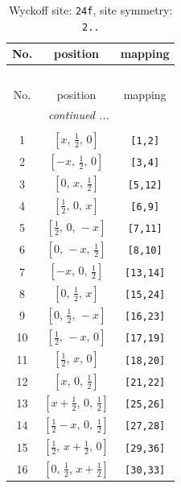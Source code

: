 \documentclass[fleqn,8pt]{jsarticle}
\begin{document}
\begin{longtable}{ccc}
\caption{Wyckoff site: {\tt 24f}, site symmetry: {\tt 2..}}
 \\
 \hline \hline
No. & position & mapping \\ \hline \endfirsthead

\multicolumn{2}{l}{\tablename\ \thetable{}} \\
 \hline \hline
No. & position & mapping \\ \hline \endhead

 \hline \hline
\multicolumn{2}{r}{\footnotesize\it continued ...} \\ \endfoot

 \hline \hline
\multicolumn{2}{r}{} \\ \endlastfoot

1 & $\left[ x,\, \frac{1}{2},\, 0 \right]$ & {\tt [1,2]} \\ \hline
2 & $\left[ - x,\, \frac{1}{2},\, 0 \right]$ & {\tt [3,4]} \\ \hline
3 & $\left[ 0,\, x,\, \frac{1}{2} \right]$ & {\tt [5,12]} \\ \hline
4 & $\left[ \frac{1}{2},\, 0,\, x \right]$ & {\tt [6,9]} \\ \hline
5 & $\left[ \frac{1}{2},\, 0,\, - x \right]$ & {\tt [7,11]} \\ \hline
6 & $\left[ 0,\, - x,\, \frac{1}{2} \right]$ & {\tt [8,10]} \\ \hline
7 & $\left[ - x,\, 0,\, \frac{1}{2} \right]$ & {\tt [13,14]} \\ \hline
8 & $\left[ 0,\, \frac{1}{2},\, x \right]$ & {\tt [15,24]} \\ \hline
9 & $\left[ 0,\, \frac{1}{2},\, - x \right]$ & {\tt [16,23]} \\ \hline
10 & $\left[ \frac{1}{2},\, - x,\, 0 \right]$ & {\tt [17,19]} \\ \hline
11 & $\left[ \frac{1}{2},\, x,\, 0 \right]$ & {\tt [18,20]} \\ \hline
12 & $\left[ x,\, 0,\, \frac{1}{2} \right]$ & {\tt [21,22]} \\ \hline
13 & $\left[ x + \frac{1}{2},\, 0,\, \frac{1}{2} \right]$ & {\tt [25,26]} \\ \hline
14 & $\left[ \frac{1}{2} - x,\, 0,\, \frac{1}{2} \right]$ & {\tt [27,28]} \\ \hline
15 & $\left[ \frac{1}{2},\, x + \frac{1}{2},\, 0 \right]$ & {\tt [29,36]} \\ \hline
16 & $\left[ 0,\, \frac{1}{2},\, x + \frac{1}{2} \right]$ & {\tt [30,33]} \\ \hline

\end{longtable}
\end{document}
